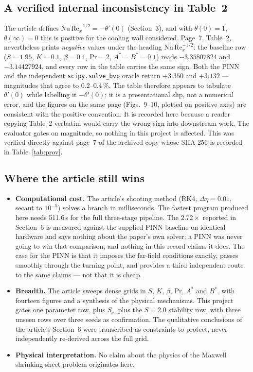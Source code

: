 \documentclass[11pt,a4paper]{article}
\newcommand{\code}[1]{\texttt{\small #1}}
\newcommand{\pct}{\,\%}
\begin{document}
\subsection{A verified internal inconsistency in Table~2}
The article defines $\mathrm{Nu}\,\mathrm{Re}_x^{-1/2} = -\theta'(0)$ (Section~3), and with
$\theta(0)=1$, $\theta(\infty)=0$ this is positive for the cooling wall considered. Page~7,
Table~2, nevertheless prints \emph{negative} values under the heading
$\mathrm{Nu}\,\mathrm{Re}_x^{-1/2}$: the baseline row
($S{=}1.95$, $K{=}0.1$, $\beta{=}0.1$, $\mathrm{Pr}{=}2$, $A^{*}{=}B^{*}{=}0.1$) reads
$-3.35807824$ and $-3.14427924$, and every row in the table carries the same sign.
Both the PINN and the independent \code{scipy.solve\_bvp} oracle return $+3.350$ and
$+3.132$ --- magnitudes that agree to $0.2$--$0.4\pct$. The table therefore appears to
tabulate $\theta'(0)$ while labelling it $-\theta'(0)$; it is a presentational slip, not a
numerical error, and the figures on the same page (Figs.~9--10, plotted on positive axes)
are consistent with the positive convention. It is recorded here because a reader copying
Table~2 verbatim would carry the wrong sign into downstream work. The evaluator gates on
magnitude, so nothing in this project is affected. This was verified directly against
page~7 of the archived copy whose SHA-256 is recorded in Table~\ref{tab:prov}.

\subsection{Where the article still wins}
\begin{itemize}[leftmargin=1.4em,itemsep=2pt]
  \item \textbf{Computational cost.} The article's shooting method (RK4, $\Delta\eta=0.01$,
        secant to $10^{-5}$) solves a branch in milliseconds. The fastest program produced
        here needs 511.6\,s for the full three-stage pipeline. The $2.72\times$ reported in
        Section~6 is measured against the supplied PINN baseline on identical hardware and
        says nothing about the paper's own solver; a PINN was never going to win that
        comparison, and nothing in this record claims it does. The case for the PINN is
        that it imposes the far-field conditions exactly, passes smoothly through the
        turning point, and provides a third independent route to the same claims --- not
        that it is cheap.
  \item \textbf{Breadth.} The article sweeps dense grids in $S$, $K$, $\beta$,
        $\mathrm{Pr}$, $A^{*}$ and $B^{*}$, with fourteen figures and a synthesis of the
        physical mechanisms. This project gates one parameter row, plus $S_c$, plus the
        $S{=}2.0$ stability row, with three unseen rows over three seeds as confirmation.
        The qualitative conclusions of the article's Section~6 were transcribed as
        constraints to protect, never independently re-derived across the full grid.
  \item \textbf{Physical interpretation.} No claim about the physics of the Maxwell
        shrinking-sheet problem originates here.
\end{itemize}
\end{document}
